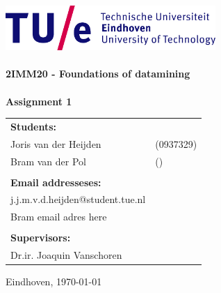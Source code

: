 \begin{titlepage}

\begin{center}

\includegraphics[width=0.6\textwidth]{./Figures/TUe}~\\[2cm]



\HRule \\[0.4cm]
{ \huge \bfseries 2IMM20 - Foundations of datamining\\[0.3cm] }
\HRule \\[1.5cm]
\textbf{Assignment 1}



\vfill

\begin{table}[h]
\begin{tabular}{ll}
\textbf{Students:} & \\
Joris van der Heijden & (0937329)\\
Bram van der Pol & ()\\

\\
\textbf{Email addresseses:} & \\
j.j.m.v.d.heijden@student.tue.nl \\
Bram email adres here \\
\\
\textbf{Supervisors:} &\\
Dr.ir. Joaquin Vanschoren
\\

\end{tabular}
\end{table}



\large
{ Eindhoven, \today}

\end{center}


\end{titlepage}
